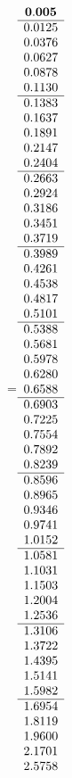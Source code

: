 =\hbox{$\begin{array}{c}
\bf 0.005 
 \\ \hline 
  0.0125 \\ 
  0.0376 \\ 
  0.0627 \\ 
  0.0878 \\ 
  0.1130
 \\ \hline 
  0.1383 \\ 
  0.1637 \\ 
  0.1891 \\ 
  0.2147 \\ 
  0.2404
 \\ \hline 
  0.2663 \\ 
  0.2924 \\ 
  0.3186 \\ 
  0.3451 \\ 
  0.3719
 \\ \hline 
  0.3989 \\ 
  0.4261 \\ 
  0.4538 \\ 
  0.4817 \\ 
  0.5101
 \\ \hline 
  0.5388 \\ 
  0.5681 \\ 
  0.5978 \\ 
  0.6280 \\ 
  0.6588
 \\ \hline 
  0.6903 \\ 
  0.7225 \\ 
  0.7554 \\ 
  0.7892 \\ 
  0.8239
 \\ \hline 
  0.8596 \\ 
  0.8965 \\ 
  0.9346 \\ 
  0.9741 \\ 
  1.0152
 \\ \hline 
  1.0581 \\ 
  1.1031 \\ 
  1.1503 \\ 
  1.2004 \\ 
  1.2536
 \\ \hline 
  1.3106 \\ 
  1.3722 \\ 
  1.4395 \\ 
  1.5141 \\ 
  1.5982
 \\ \hline 
  1.6954 \\ 
  1.8119 \\ 
  1.9600 \\ 
  2.1701 \\ 
  2.5758
 \end{array}$}
